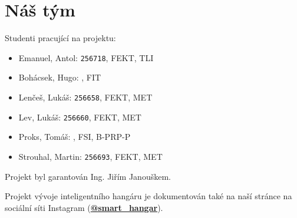 \documentclass{article} %
\begin{document}
	\pagestyle{empty}
    
		\selectfont
		\section{Náš tým}
                Studenti pracující na projektu:
                \begin{itemize}
                    \item Emanuel, Antol: \texttt{256718}, FEKT, TLI
                    \item Bohácsek, Hugo: \texttt{}, FIT
                    \item Lenčeš, Lukáš: \texttt{256658}, FEKT, MET
                    \item Lev, Lukáš: \texttt{256660}, FEKT, MET
                    \item Proks, Tomáš: \texttt{}, FSI, B-PRP-P
                    \item Strouhal, Martin: \texttt{256693}, FEKT, MET
                \end{itemize}
                
                \vspace{.5cm}
                \noindent
                Projekt byl garantován Ing. Jiřím Janouškem.\\

                \noindent
                Projekt vývoje inteligentního hangáru je dokumentován také na naší stránce na sociální síti Instagram (\href{https://www.instagram.com/smart_hangar/}{\textbf{@smart\_hangar}}).
                               
\end{document}
